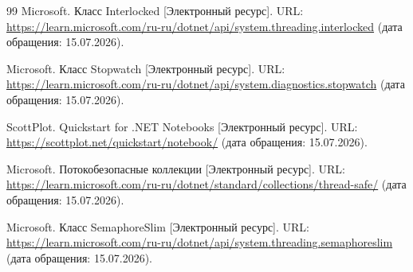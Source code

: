 \documentclass[14pt,a4paper]{extarticle}
\begin{document}
\begin{thebibliography}{99}
    Microsoft. Класс Interlocked [Электронный ресурс]. URL: \url{https://learn.microsoft.com/ru-ru/dotnet/api/system.threading.interlocked} (дата обращения: 15.07.2026).

    Microsoft. Класс Stopwatch [Электронный ресурс]. URL: \url{https://learn.microsoft.com/ru-ru/dotnet/api/system.diagnostics.stopwatch} (дата обращения: 15.07.2026).

    ScottPlot. Quickstart for .NET Notebooks [Электронный ресурс]. URL: \url{https://scottplot.net/quickstart/notebook/} (дата обращения: 15.07.2026).

    Microsoft. Потокобезопасные коллекции [Электронный ресурс]. URL: \url{https://learn.microsoft.com/ru-ru/dotnet/standard/collections/thread-safe/} (дата обращения: 15.07.2026).

    Microsoft. Класс SemaphoreSlim [Электронный ресурс]. URL: \url{https://learn.microsoft.com/ru-ru/dotnet/api/system.threading.semaphoreslim} (дата обращения: 15.07.2026).
\end{thebibliography}
\end{document}
